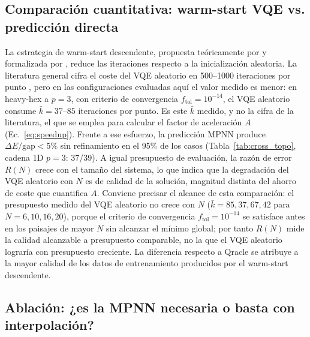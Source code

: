 \documentclass[11pt,a4paper,spanish]{book}
\begin{document}
\subsection{Comparación cuantitativa: warm-start VQE vs. predicción directa}

La estrategia de warm-start descendente, propuesta teóricamente por \citet{mele2022} y formalizada por \citet{puig2025}, reduce las iteraciones respecto a la inicialización aleatoria. La literatura general cifra el coste del VQE aleatorio en 500--1000 iteraciones por punto \citep{tilly2022}, pero en las configuraciones evaluadas aquí el valor medido es menor: en heavy-hex a $p = 3$, con criterio de convergencia $f_{\text{tol}} = 10^{-14}$, el VQE aleatorio consume $\bar{k} = 37$--$85$ iteraciones por punto. Es este $\bar{k}$ medido, y no la cifra de la literatura, el que se emplea para calcular el factor de aceleración $A$ (Ec.~\ref{eq:speedup}). Frente a ese esfuerzo, la predicción MPNN produce $\Delta E/\text{gap} < 5\%$ sin refinamiento en el 95\% de los casos (Tabla~\ref{tab:cross_topo}, cadena 1D $p = 3$: 37/39). A igual presupuesto de evaluación, la razón de error $R(N)$ crece con el tamaño del sistema, lo que indica que la degradación del VQE aleatorio con $N$ es de calidad de la solución, magnitud distinta del ahorro de coste que cuantifica $A$. Conviene precisar el alcance de esta comparación: el presupuesto medido del VQE aleatorio no crece con $N$ ($\bar{k} = 85, 37, 67, 42$ para $N = 6, 10, 16, 20$), porque el criterio de convergencia $f_{\text{tol}} = 10^{-14}$ se satisface antes en los paisajes de mayor $N$ sin alcanzar el mínimo global; por tanto $R(N)$ mide la calidad alcanzable a presupuesto comparable, no la que el VQE aleatorio lograría con presupuesto creciente. La diferencia respecto a Qracle \citep{zhang2025} se atribuye a la mayor calidad de los datos de entrenamiento producidos por el warm-start descendente.


\subsection{Ablación: ¿es la MPNN necesaria o basta con interpolación?}
\end{document}
